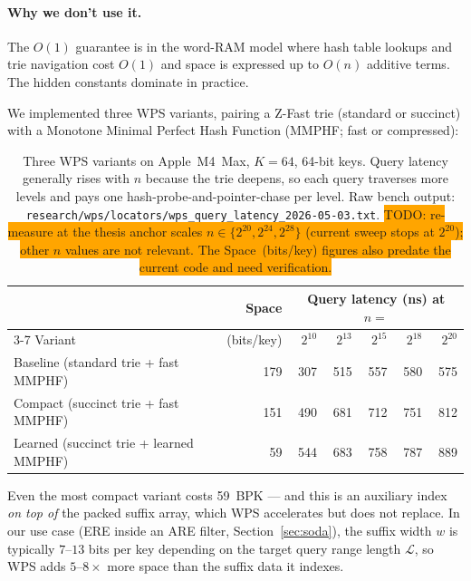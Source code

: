 \paragraph{Why we don't use it.}
The $O(1)$ guarantee is in the word-RAM model where hash table
lookups and trie navigation cost $O(1)$ and space is expressed up
to $O(n)$ additive terms. The hidden constants dominate in
practice.

We implemented three WPS variants, pairing a Z-Fast trie (standard or
succinct) with a Monotone Minimal Perfect Hash Function (MMPHF; fast or
compressed):

\begin{table}[H]
    \centering
    \begin{tabular}{@{}lrrrrrr@{}}
        \toprule
                                                & Space   & \multicolumn{5}{c}{Query latency (ns) at $n =$} \\
        \cmidrule(lr){3-7}
        Variant                                 & (bits/key) & $2^{10}$ & $2^{13}$ & $2^{15}$ & $2^{18}$ & $2^{20}$ \\
        \midrule
        Baseline (standard trie + fast MMPHF)   & 179        & 307      & 515      & 557      & 580      & 575      \\
        Compact (succinct trie + fast MMPHF)    & 151        & 490      & 681      & 712      & 751      & 812      \\
        Learned (succinct trie + learned MMPHF) & 59         & 544      & 683      & 758      & 787      & 889      \\
        \bottomrule
    \end{tabular}
    \caption{Three WPS variants on Apple~M4~Max, $K = 64$, 64-bit keys.
        Query latency generally rises with $n$ because the trie deepens,
        so each query traverses more levels and pays one
        hash-probe-and-pointer-chase per level. Raw bench output:
        \texttt{research/wps/locators/wps\_query\_latency\_2026-05-03.txt}.
        \colorbox{orange}{TODO: re-measure at the thesis anchor scales
            $n \in \{2^{20}, 2^{24}, 2^{28}\}$ (current sweep stops at $2^{20}$);
            other $n$ values are not relevant. The Space~(bits/key) figures
            also predate the current code and need verification.}}
    \label{tab:wps-cost}
\end{table}

Even the most compact variant costs 59~BPK --- and this is an auxiliary
index \emph{on top of} the packed suffix array, which WPS accelerates but
does not replace. In our use case (ERE inside an ARE
filter, Section~\ref{sec:soda}), the suffix width $w$ is typically
$7$--$13$ bits per key depending on the target query range length $\mathcal{L}$, so WPS adds $5$--$8\times$ more space than the
suffix data it indexes.


